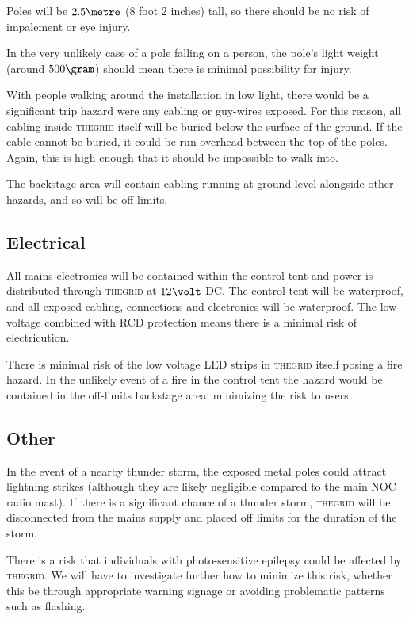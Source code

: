 \documentclass[12pt]{article} %
\newcommand{\thegrid}{\textsc{the\textperiodcentered grid}\xspace}
\begin{document}
Poles will be $2.5\metre$ (8 foot 2 inches) tall, so there should be no risk of
impalement or eye injury.

In the very unlikely case of a pole falling on a person, the pole's light
weight (around $500\gram$) should mean there is minimal possibility for injury.

With people walking around the installation in low light, there would be a
significant trip hazard were any cabling or guy-wires exposed.  For this
reason, all cabling inside \thegrid itself will be buried below the surface of
the ground.  If the cable cannot be buried, it could be run overhead between
the top of the poles.  Again, this is high enough that it should be impossible
to walk into.

The backstage area will contain cabling running at ground level alongside other
hazards, and so will be off limits.

\subsection{Electrical}
All mains electronics will be contained within the control tent and power is
distributed through \thegrid at $12\volt$ DC\@.  The control tent will be
waterproof, and all exposed cabling, connections and electronics will be
waterproof.  The low voltage combined with RCD protection means there is a
minimal risk of electricution.

There is minimal risk of the low voltage LED strips in \thegrid itself posing a
fire hazard.  In the unlikely event of a fire in the control tent the hazard
would be contained in the off-limits backstage area, minimizing the risk to
users.

\subsection{Other}
In the event of a nearby thunder storm, the exposed metal poles could attract
lightning strikes (although they are likely negligible compared to the main NOC
radio mast).  If there is a significant chance of a thunder storm, \thegrid
will be disconnected from the mains supply and placed off limits for the
duration of the storm.

There is a risk that individuals with photo-sensitive epilepsy could be
affected by \thegrid.  We will have to investigate further how to minimize this
risk, whether this be through appropriate warning signage or avoiding
problematic patterns such as flashing.
\end{document}
